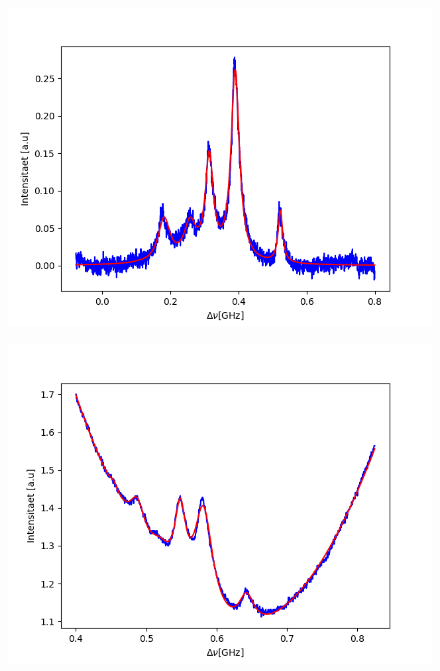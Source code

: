 \documentclass[a4paper,parskip]{scrartcl}
\begin{document}
\begin{figure}[h]
\includegraphics[scale = 0.5]{./saturation/peak1/gaussCorrected.png}
\end{figure}

\begin{figure}[h]
\includegraphics[scale = 0.5]{./saturation/peak2/fit.png}
\end{figure}
\end{document}
